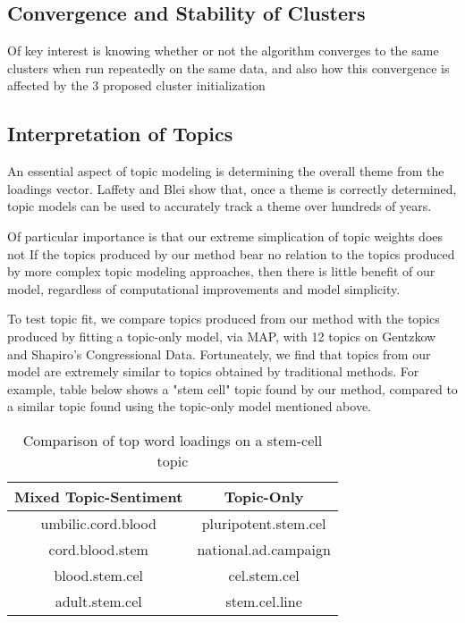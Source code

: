 \documentclass[12pt]{article}
\begin{document}
\subsection{Convergence and Stability of Clusters}

Of key interest is knowing whether or not the algorithm converges to the same clusters when run repeatedly on the same data, and also how this convergence is affected by the 3 proposed cluster initialization 

\subsection{Interpretation of Topics}

An essential aspect of topic modeling is determining the overall theme from the loadings vector. Laffety and Blei show that, once a theme is correctly determined, topic models can be used to accurately track a theme over hundreds of years. 

Of particular importance is that our extreme simplication of topic weights does not 
If the topics produced by our method bear no relation to the topics produced by more complex topic modeling approaches, then there is little benefit of our model, regardless of computational improvements and model simplicity. 

To test topic fit, we compare topics produced from our method with the topics produced by fitting a topic-only model, via MAP, with 12 topics on Gentzkow and Shapiro's Congressional Data. Fortuneately, we find that topics from our model are extremely similar to topics obtained by traditional methods. For example, table below shows a "stem cell" topic found by our method, compared to a similar topic found using the topic-only model mentioned above.

\begin{table}
\caption{Comparison of top word loadings on a stem-cell topic} \label{tab:title}
\begin{center}
\begin{tabular}{  c  c }
Mixed Topic-Sentiment & Topic-Only \\
\hline
umbilic.cord.blood & pluripotent.stem.cel \\
cord.blood.stem  & national.ad.campaign \\
blood.stem.cel   & cel.stem.cel \\
adult.stem.cel & stem.cel.line \\
\end{tabular}
\end{center}
\end{table}
\end{document}
